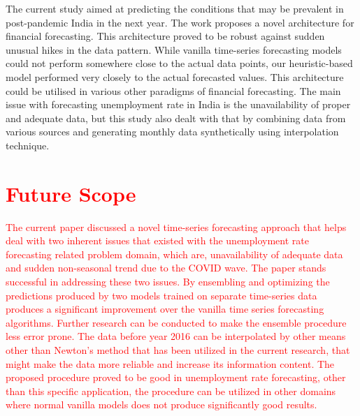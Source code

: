 \documentclass[times,twocolumn,final,authoryear]{elsarticle}
\begin{document}
	The current study aimed at predicting the conditions that may be prevalent in post-pandemic India in the next year. The work proposes a novel architecture for financial forecasting. This architecture proved to be robust against sudden unusual hikes in the data pattern. While vanilla time-series forecasting models could not perform somewhere close to the actual data points, our heuristic-based model performed very closely to the actual forecasted values. This architecture could be utilised in various other paradigms of financial forecasting. The main issue with forecasting unemployment rate in India is the unavailability of proper and adequate data, but this study also dealt with that by combining data from various sources and generating monthly data synthetically using interpolation technique.
	

	\section{\textcolor{red}{Future Scope}}\label{Sec_Future}
	\textcolor{red}{The current paper discussed a novel time-series forecasting approach that helps deal with two inherent issues that existed with the unemployment rate forecasting related problem domain, which are, unavailability of adequate data and sudden non-seasonal trend due to the COVID wave. The paper stands successful in addressing these two issues. By ensembling and optimizing the predictions produced by two models trained on separate time-series data produces a significant improvement over the vanilla time series forecasting algorithms. Further research can be conducted to make the ensemble procedure less error prone. The data before year 2016 can be interpolated by other means other than Newton's method that has been utilized in the current research, that might make the data more reliable and increase its information content. The proposed procedure proved to be good in unemployment rate forecasting, other than this specific application, the procedure can be utilized in other domains where normal vanilla models does not produce significantly good results.}
	
\end{document}
